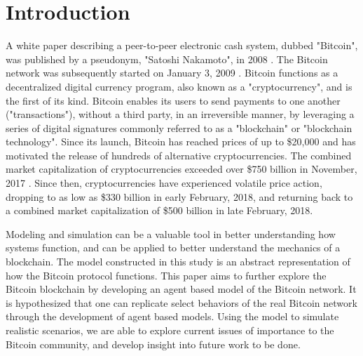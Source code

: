 \documentclass[12pt]{report}
\begin{document}
\section{Introduction}
A white paper describing a peer-to-peer electronic cash system, dubbed "Bitcoin", was published by a pseudonym, "Satoshi Nakamoto", in 2008 \cite{Nakamoto.2008}. The Bitcoin network was subsequently started on January 3, 2009 \cite{blockchain.info.}. Bitcoin functions as a decentralized digital currency program, also known as a "cryptocurrency", and is the first of its kind. Bitcoin enables its users to send payments to one another ("transactions"), without a third party, in an irreversible manner, by leveraging a series of digital signatures commonly referred to as a "blockchain" or "blockchain technology". Since its launch, Bitcoin has reached prices of up to \$20,000 and has motivated the release of hundreds of alternative cryptocurrencies. The combined market capitalization of cryptocurrencies exceeded over \$750 billion in November, 2017 \cite{Coinmarketcap.com.2017}. Since then, cryptocurrencies have experienced volatile price action, dropping to as low as \$330 billion in early February, 2018, and returning back to a combined market capitalization of \$500 billion in late February, 2018.


Modeling and simulation can be a valuable tool in better understanding how systems function, and can be applied to better understand the mechanics of a blockchain. The model constructed in this study is an abstract representation of how the Bitcoin protocol functions. This paper aims to further explore the Bitcoin blockchain by developing an agent based model of the Bitcoin network. It is hypothesized that one can replicate select behaviors of the real Bitcoin network through the development of agent based models. Using the model to simulate realistic scenarios, we are able to explore current issues of importance to the Bitcoin community, and develop insight into future work to be done.
\end{document}
